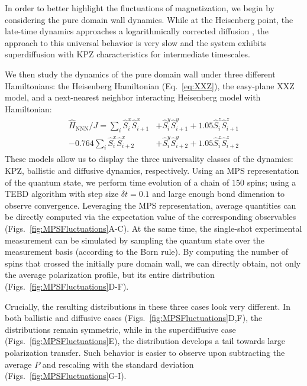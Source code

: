 \documentclass[
 reprint,
 superscriptaddress,
 amsmath,amssymb,
 aps,
 pra,
]{revtex4-2}
\begin{document}
In order to better highlight the fluctuations of magnetization, we begin by considering the pure domain wall dynamics.
While at the Heisenberg point, the late-time dynamics approaches a logarithmically corrected diffusion \cite{Gamayun2019}, the approach to this universal behavior is very slow and the system exhibits superdiffusion with KPZ characteristics for intermediate timescales.

We then study the dynamics of the pure domain wall under three different Hamiltonians: the Heisenberg Hamiltonian (Eq.~\ref{eq:XXZ}), the easy-plane XXZ model, and a next-nearest neighbor interacting Heisenberg model with Hamiltonian:
\begin{align}\begin{split}
    \hat{H}_{\mathrm{NNN}}/J = \sum_{i} \hat{S}^x_i\hat{S}^x_{i+1} &+ \hat{S}^y_i\hat{S}^y_{i+1} + 1.05 \hat{S}^z_i\hat{S}^z_{i+1} \\
    - 0.764 \sum_{i} \hat{S}^x_i\hat{S}^x_{i+2} &+ \hat{S}^y_i\hat{S}^y_{i+2} + 1.05 \hat{S}^z_i\hat{S}^z_{i+2}
\end{split}\end{align}
These models allow us to display the three universality classes of the dynamics: KPZ, ballistic and diffusive dynamics, respectively.
Using an MPS representation of the quantum state, we perform time evolution of a chain of $150$ spins; using a TEBD algorithm with step size $\delta t = 0.1$ and large enough bond dimension to observe convergence.
Leveraging the MPS representation, average quantities can be directly computed via the expectation value of the corresponding observables (Figs.~\ref{fig:MPSFluctuations}A-C).
At the same time, the single-shot experimental measurement can be simulated by sampling the quantum state over the measurement basis (according to the Born rule).
By computing the number of spins that crossed the initially pure domain wall, we can directly obtain, not only the average polarization profile, but its entire distribution (Figs.~\ref{fig:MPSFluctuations}D-F).


Crucially, the resulting distributions in these three cases look very different. 
In both ballistic and diffusive cases (Figs.~\ref{fig:MPSFluctuations}D,F), the distributions remain symmetric, while in the superdiffusive case (Figs.~\ref{fig:MPSFluctuations}E), the distribution develops a tail towards large polarization transfer.
Such behavior is easier to observe upon subtracting the average $P$ and rescaling with the standard deviation (Figs.~\ref{fig:MPSFluctuations}G-I).
\end{document}
